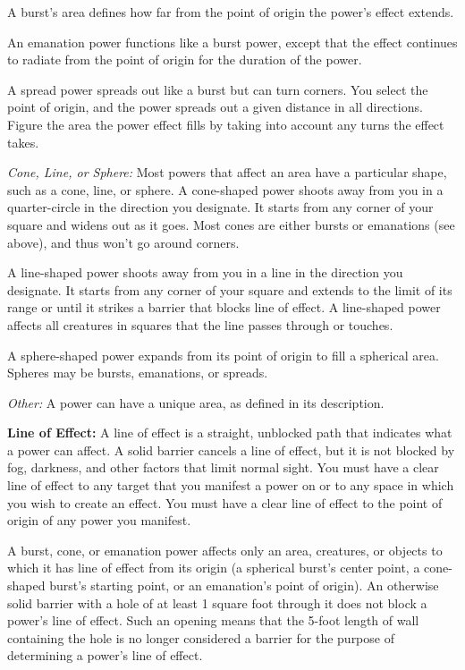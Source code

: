 \documentclass{article}
\begin{document}
A burst's area defines how far from the point of origin the power's effect extends.

An emanation power functions like a burst power, except that the effect continues 
to radiate from the point of origin for the duration of the power.

A spread power spreads out like a burst but can turn corners. You select the point 
of origin, and the power spreads out a given distance in all directions. Figure 
the area the power effect fills by taking into account any turns the effect takes.

\textit{Cone, Line, or Sphere: }Most powers that affect an area have a particular 
shape, such as a cone, line, or sphere. A cone-shaped power shoots away from you 
in a quarter-circle in the direction you designate. It starts from any corner of 
your square and widens out as it goes. Most cones are either bursts or emanations 
(see above), and thus won't go around corners.

A line-shaped power shoots away from you in a line in the direction you designate. 
It starts from any corner of your square and extends to the limit of its range 
or until it strikes a barrier that blocks line of effect. A line-shaped power affects 
all creatures in squares that the line passes through or touches.

A sphere-shaped power expands from its point of origin to fill a spherical area. 
Spheres may be bursts, emanations, or spreads.

\textit{Other: }A power can have a unique area, as defined in its description.

\textbf{Line of Effect:} A line of effect is a straight, unblocked path that indicates 
what a power can affect. A solid barrier cancels a line of effect, but it is not 
blocked by fog, darkness, and other factors that limit normal sight. You must have 
a clear line of effect to any target that you manifest a power on or to any space 
in which you wish to create an effect. You must have a clear line of effect to 
the point of origin of any power you manifest.

A burst, cone, or emanation power affects only an area, creatures, or objects to 
which it has line of effect from its origin (a spherical burst's center point, 
a cone-shaped burst's starting point, or an emanation's point of origin). An otherwise 
solid barrier with a hole of at least 1 square foot through it does not block a 
power's line of effect. Such an opening means that the 5-foot length of wall containing 
the hole is no longer considered a barrier for the purpose of determining a power's 
line of effect.
\end{document}
